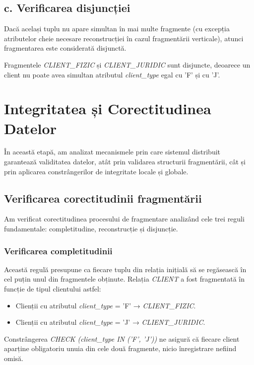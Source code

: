 \section*{c. Verificarea disjuncției}

Dacă același tuplu nu apare simultan în mai multe fragmente (cu excepția atributelor cheie necesare reconstrucției în cazul fragmentării verticale), atunci fragmentarea este considerată disjunctă.

Fragmentele \textit{CLIENT\_FIZIC} și \textit{CLIENT\_JURIDIC} sunt disjuncte, deoarece un client nu poate avea simultan atributul \textit{client\_type} egal cu 'F' și cu 'J'.

\chapter{Integritatea și Corectitudinea Datelor}
\label{sec:integritate_corectitudine}
În această etapă, am analizat mecanismele prin care sistemul distribuit garantează validitatea datelor, atât prin validarea structurii fragmentării, cât și prin aplicarea constrângerilor de integritate locale și globale.
\section{Verificarea corectitudinii fragmentării}
Am verificat corectitudinea procesului de fragmentare analizând cele trei reguli fundamentale: completitudine, reconstrucție și disjuncție.
\subsection{Verificarea completitudinii}
Această regulă presupune ca fiecare tuplu din relația inițială să se regăsească în cel puțin unul din fragmentele obținute. Relația \textit{CLIENT} a fost fragmentată în funcție de tipul clientului astfel:
\begin{itemize}
\item Clienții cu atributul \textit{client\_type} = 'F' → \textit{CLIENT\_FIZIC}.
\item Clienții cu atributul \textit{client\_type} = 'J' → \textit{CLIENT\_JURIDIC}.
\end{itemize}
Constrângerea \textit{CHECK (client\_type IN ('F', 'J'))} ne asigură că fiecare client aparține obligatoriu unuia din cele două fragmente, nicio înregistrare nefiind omisă.
